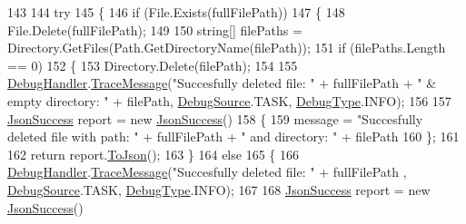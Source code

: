 \begin{DoxyCode}
143 
144             \textcolor{keywordflow}{try}
145             \{
146                 \textcolor{keywordflow}{if} (File.Exists(fullFilePath))
147                 \{
148                     File.Delete(fullFilePath);
149 
150                     \textcolor{keywordtype}{string}[] filePaths = Directory.GetFiles(Path.GetDirectoryName(filePath));
151                     \textcolor{keywordflow}{if} (filePaths.Length == 0)
152                     \{
153                         Directory.Delete(filePath);
154 
155                         \mbox{\hyperlink{class_little_weeb_library_1_1_handlers_1_1_file_handler_a131760e1828cd7ae1df2e90e9f300426}{DebugHandler}}.\mbox{\hyperlink{interface_little_weeb_library_1_1_handlers_1_1_i_debug_handler_a2e405bc3492e683cd3702fae125221bc}{TraceMessage}}(\textcolor{stringliteral}{"Succesfully deleted file: "} + 
      fullFilePath + \textcolor{stringliteral}{" & empty directory: "} + filePath, \mbox{\hyperlink{namespace_little_weeb_library_1_1_handlers_a2a6ca0775121c9c503d58aa254d292be}{DebugSource}}.TASK, 
      \mbox{\hyperlink{namespace_little_weeb_library_1_1_handlers_ab66019ed40462876ec4e61bb3ccb0a62}{DebugType}}.INFO);
156 
157                         \mbox{\hyperlink{class_little_weeb_library_1_1_models_1_1_json_success}{JsonSuccess}} report = \textcolor{keyword}{new} \mbox{\hyperlink{class_little_weeb_library_1_1_models_1_1_json_success}{JsonSuccess}}()
158                         \{
159                             message = \textcolor{stringliteral}{"Succesfully deleted file with path: "} + fullFilePath + \textcolor{stringliteral}{" and
       directory: "} + filePath
160                         \};
161 
162                         \textcolor{keywordflow}{return} report.\mbox{\hyperlink{class_little_weeb_library_1_1_models_1_1_json_success_a407103dc37a77aaf47a782296bab7518}{ToJson}}();
163                     \}
164                     \textcolor{keywordflow}{else}
165                     \{
166                         \mbox{\hyperlink{class_little_weeb_library_1_1_handlers_1_1_file_handler_a131760e1828cd7ae1df2e90e9f300426}{DebugHandler}}.\mbox{\hyperlink{interface_little_weeb_library_1_1_handlers_1_1_i_debug_handler_a2e405bc3492e683cd3702fae125221bc}{TraceMessage}}(\textcolor{stringliteral}{"Succesfully deleted file: "} + 
      fullFilePath , \mbox{\hyperlink{namespace_little_weeb_library_1_1_handlers_a2a6ca0775121c9c503d58aa254d292be}{DebugSource}}.TASK, \mbox{\hyperlink{namespace_little_weeb_library_1_1_handlers_ab66019ed40462876ec4e61bb3ccb0a62}{DebugType}}.INFO);
167 
168                         \mbox{\hyperlink{class_little_weeb_library_1_1_models_1_1_json_success}{JsonSuccess}} report = \textcolor{keyword}{new} \mbox{\hyperlink{class_little_weeb_library_1_1_models_1_1_json_success}{JsonSuccess}}()

\end{DoxyCode}
